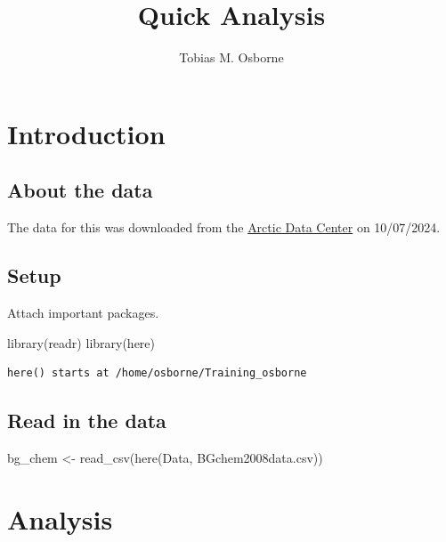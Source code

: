 \documentclass[
  letterpaper,
  DIV=11,
  numbers=noendperiod]{scrartcl}
\title{Quick Analysis}
\author{Tobias M. Osborne}
\date{}
\newenvironment{Shaded}{\begin{snugshade}}{\end{snugshade}}
\newcommand{\FunctionTok}[1]{\textcolor[rgb]{0.28,0.35,0.67}{#1}}
\newcommand{\NormalTok}[1]{\textcolor[rgb]{0.00,0.23,0.31}{#1}}
\newcommand{\OtherTok}[1]{\textcolor[rgb]{0.00,0.23,0.31}{#1}}
\newcommand{\StringTok}[1]{\textcolor[rgb]{0.13,0.47,0.30}{#1}}
\begin{document}
\maketitle

\section{Introduction}\label{introduction}

\subsection{About the data}\label{about-the-data}

The data for this was downloaded from the
\href{https://arcticdata.io/}{Arctic Data Center} on 10/07/2024.

\subsection{Setup}\label{setup}

Attach important packages.

\begin{Shaded}
\begin{Highlighting}[]
\FunctionTok{library}\NormalTok{(readr)}
\FunctionTok{library}\NormalTok{(here)}
\end{Highlighting}
\end{Shaded}

\begin{verbatim}
here() starts at /home/osborne/Training_osborne
\end{verbatim}

\subsection{Read in the data}\label{read-in-the-data}

\begin{Shaded}
\begin{Highlighting}[]
\NormalTok{bg\_chem }\OtherTok{\textless{}{-}} \FunctionTok{read\_csv}\NormalTok{(}\FunctionTok{here}\NormalTok{(}\StringTok{\textquotesingle{}Data\textquotesingle{}}\NormalTok{, }\StringTok{\textquotesingle{}BGchem2008data.csv\textquotesingle{}}\NormalTok{))}
\end{Highlighting}
\end{Shaded}

\section{Analysis}\label{analysis}
\end{document}

